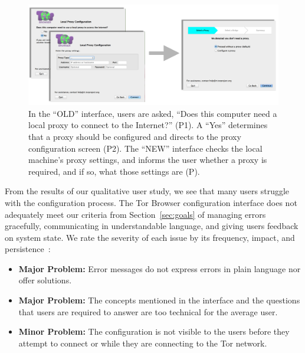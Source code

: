 \documentclass[USenglish,oneside,twocolumn]{article}
\begin{document}
\begin{figure}[t]
	\centering
		\includegraphics[width=.8\textwidth]{proxy-screens.pdf} 
		\caption{In the ``OLD'' interface, users are asked, ``Does this computer need a local proxy to connect
		to the Internet?'' (P1). A ``Yes'' determines that a proxy should be configured and directs to the 
		proxy configuration screen (P2). The ``NEW'' interface checks the local machine's proxy settings,
		and informs the user whether a proxy is required, and if so, what those settings are (P).}
\end{figure}

From the results of our qualitative user study, we see that many users struggle with the configuration process. 
The Tor Browser configuration interface does not adequately meet our criteria from Section~\ref{sec:goals} of
managing errors gracefully, communicating in understandable language, and giving  users feedback on system state. 
We rate the severity of each issue by its frequency, impact, and persistence~\cite{nielsen1994heuristic}:\\

\begin{itemize}
\item {\bfseries Major Problem:} Error messages do not express errors in plain language nor offer solutions. 
\item {\bfseries Major Problem:} The concepts mentioned in the interface and the questions that users are required to answer are too technical for the average user. 
\item {\bfseries Minor Problem:} The configuration is not visible to the users before they attempt to connect or while they are connecting to the Tor network.
 \end{itemize} 
 
\end{document}

